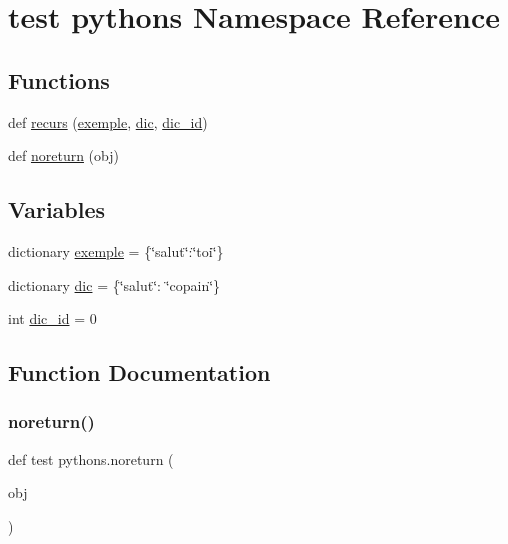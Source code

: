 \hypertarget{namespacetest_01pythons}{}\section{test pythons Namespace Reference}
\label{namespacetest_01pythons}
\subsection*{Functions}
\begin{DoxyCompactItemize}
\item 
def \hyperlink{namespacetest_01pythons_a47729b63dec1d2009dac659f3799e58d}{recurs} (\hyperlink{namespacetest_01pythons_a8e0bfabcfdd19185e780cd2061449b37}{exemple}, \hyperlink{namespacetest_01pythons_a5ee650aa154d3ad769048fb3962bd863}{dic}, \hyperlink{namespacetest_01pythons_a1b2b80b8dfe0ff2a6dd68f854342c9c5}{dic\+\_\+id})
\item 
def \hyperlink{namespacetest_01pythons_ad81e985019f76816eb5e41aa7aa5503e}{noreturn} (obj)
\end{DoxyCompactItemize}
\subsection*{Variables}
\begin{DoxyCompactItemize}
\item 
dictionary \hyperlink{namespacetest_01pythons_a8e0bfabcfdd19185e780cd2061449b37}{exemple} = \{\char`\"{}salut\char`\"{}\+:\char`\"{}toi\char`\"{}\}
\item 
dictionary \hyperlink{namespacetest_01pythons_a5ee650aa154d3ad769048fb3962bd863}{dic} = \{\char`\"{}salut\char`\"{}\+: \char`\"{}copain\char`\"{}\}
\item 
int \hyperlink{namespacetest_01pythons_a1b2b80b8dfe0ff2a6dd68f854342c9c5}{dic\+\_\+id} = 0
\end{DoxyCompactItemize}


\subsection{Function Documentation}
\mbox{\label{namespacetest_01pythons_ad81e985019f76816eb5e41aa7aa5503e}} 
\subsubsection{\texorpdfstring{noreturn()}{noreturn()}}
{\footnotesize\ttfamily def test pythons.\+noreturn (\begin{DoxyParamCaption}\item[{}]{obj }\end{DoxyParamCaption})}

